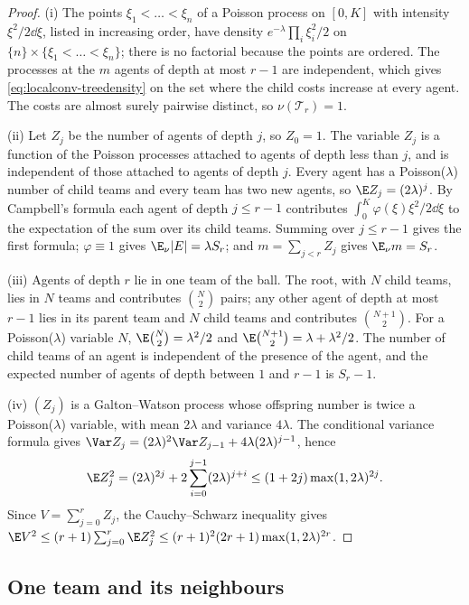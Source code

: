 \begin{proof}
(i) The points $\xi_1<\dots<\xi_n$ of a Poisson process on $[0,K]$ with intensity
$\xi^2/2\dd\xi$, listed in increasing order, have density $e^{-\lambda}\prod_i\xi_i^2/2$ on
$\{n\}\times\{\xi_1<\dots<\xi_n\}$; there is no factorial because the points are ordered.
The processes at the $m$ agents of depth at most $r-1$ are independent, which gives
\eqref{eq:localconv-treedensity} on the set where the child costs increase at every agent.
The costs are almost surely pairwise distinct, so $\nu(\mathcal T_r)=1$.

(ii) Let $Z_j$ be the number of agents of depth $j$, so $Z_0=1$. The variable $Z_j$ is a
function of the Poisson processes attached to agents of depth less than $j$, and is
independent of those attached to agents of depth $j$. Every agent has a Poisson($\lambda$)
number of child teams and every team has two new agents, so $\E Z_j=(2\lambda)^j$. By
Campbell's formula each agent of depth $j\le r-1$ contributes
$\int_0^K\varphi(\xi)\xi^2/2\dd\xi$ to the expectation of the sum over its child teams.
Summing over $j\le r-1$ gives the first formula; $\varphi\equiv1$ gives $\E_\nu|E|=\lambda
S_r$; and $m=\sum_{j<r}Z_j$ gives $\E_\nu m=S_r$.

(iii) Agents of depth $r$ lie in one team of the ball. The root, with $N$ child teams, lies
in $N$ teams and contributes $\binom N2$ pairs; any other agent of depth at most $r-1$ lies
in its parent team and $N$ child teams and contributes $\binom{N+1}2$. For a
Poisson($\lambda$) variable $N$, $\E\binom N2=\lambda^2/2$ and
$\E\binom{N+1}2=\lambda+\lambda^2/2$. The number of child teams of an agent is independent
of the presence of the agent, and the expected number of agents of depth between $1$ and
$r-1$ is $S_r-1$.

(iv) $(Z_j)$ is a Galton--Watson process whose offspring number is twice a
Poisson($\lambda$) variable, with mean $2\lambda$ and variance $4\lambda$. The conditional
variance formula gives $\Var Z_j=(2\lambda)^2\Var Z_{j-1}+4\lambda(2\lambda)^{j-1}$, hence
\[
\E Z_j^2=(2\lambda)^{2j}+2\sum_{i=0}^{j-1}(2\lambda)^{j+i}\le(1+2j)\max(1,2\lambda)^{2j}.
\]
Since $V=\sum_{j=0}^rZ_j$, the Cauchy--Schwarz inequality gives
$\E V^2\le(r+1)\sum_{j=0}^r\E Z_j^2\le(r+1)^2(2r+1)\max(1,2\lambda)^{2r}$.
\end{proof}

\subsection{One team and its neighbours}\label{sec:localconv-oneteam}

